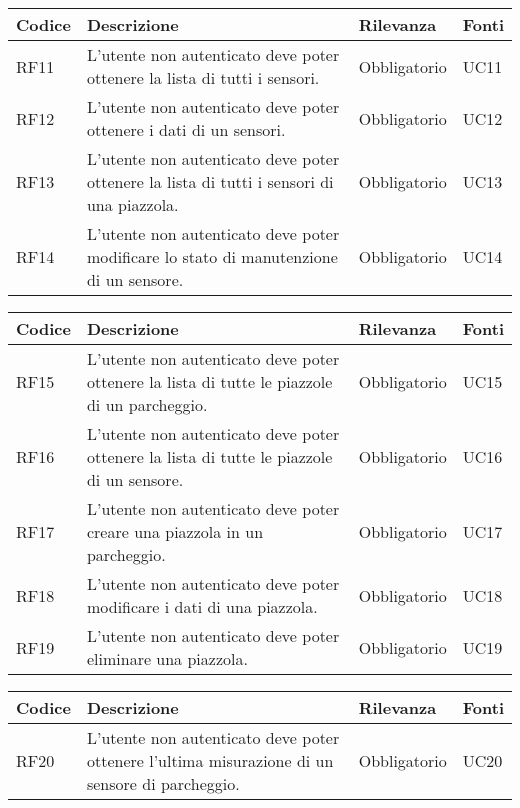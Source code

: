 \leavevmode\newline
\begin{table}
    \begin{tabular}{|p{1cm}|p{6cm}|p{1.9cm}|p{1.8cm}|} 
    \hline
    Codice & Descrizione & Rilevanza &  Fonti \\ 
    \hline
    RF11 & L'utente non autenticato deve poter ottenere la lista di tutti i sensori. & Obbligatorio & UC11 \\ 
    \hline
    RF12 & L'utente non autenticato deve poter ottenere i dati di un sensori. & Obbligatorio & UC12 \\ 
    \hline
    RF13 & L'utente non autenticato deve poter ottenere la lista di tutti i sensori di una piazzola. & Obbligatorio & UC13 \\ 
    \hline
    RF14 & L'utente non autenticato deve poter modificare lo stato di manutenzione di un sensore. & Obbligatorio & UC14 \\ 
    \hline
    \end{tabular}
\end{table}

\leavevmode\newline
\begin{table}
    \begin{tabular}{|p{1cm}|p{6cm}|p{1.9cm}|p{1.8cm}|} 
    \hline
    Codice & Descrizione & Rilevanza &  Fonti \\ 
    \hline
    RF15 & L'utente non autenticato deve poter ottenere la lista di tutte le piazzole di un parcheggio. & Obbligatorio & UC15 \\ 
    \hline
    RF16 & L'utente non autenticato deve poter ottenere la lista di tutte le piazzole di un sensore. & Obbligatorio & UC16 \\ 
    \hline
    RF17 & L'utente non autenticato deve poter creare una piazzola in un parcheggio. & Obbligatorio & UC17 \\ 
    \hline
    RF18 & L'utente non autenticato deve poter modificare i dati di una piazzola. & Obbligatorio & UC18 \\
    \hline
    RF19 & L'utente non autenticato deve poter eliminare una piazzola. & Obbligatorio & UC19 \\
    \hline
    \end{tabular}
\end{table}

\leavevmode\newline
\begin{table}
    \begin{tabular}{|p{1cm}|p{6cm}|p{1.9cm}|p{1.8cm}|} 
    \hline
    Codice & Descrizione & Rilevanza &  Fonti \\ 
    \hline
    RF20 & L'utente non autenticato deve poter ottenere l'ultima misurazione di un sensore di parcheggio. & Obbligatorio & UC20 \\ 
    \hline
    \end{tabular}
\end{table}

